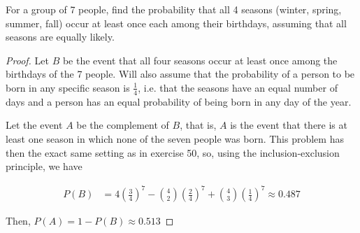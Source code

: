 \begin{exercise}{51}
For a group of 7 people, find the probability that all 4 seasons (winter, spring, summer, fall) occur at least once each among their birthdays, assuming that all seasons are equally likely.
\end{exercise}

\begin{proof}
    Let $B$ be the event that all four seasons occur at least once among the birthdays of the 7 people. Will also assume that the probability of a person to be born in any specific season is $\frac{1}{4}$, i.e. that the seasons have an equal number of days and a person has an equal probability of being born in any day of the year.

    Let the event $A$ be the complement of $B$, that is, $A$ is the event that there is at least one season in which none of the seven people was born. This problem has then the exact same setting as in exercise 50, so, using the inclusion-exclusion principle, we have

    \begin{align*}
        P(B) &= 4(\frac{3}{4})^7 - {4 \choose 2} (\frac{2}{4})^7 + {4 \choose 3} (\frac{1}{4})^7 \approx 0.487
    \end{align*}

    Then, $P(A) = 1 - P(B) \approx 0.513$
\end{proof}

